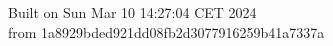 {\noindent Built on Sun Mar 10 14:27:04 CET 2024} \\ 
 {\noindent from 1a8929bded921dd08fb2d3077916259b41a7337a}

